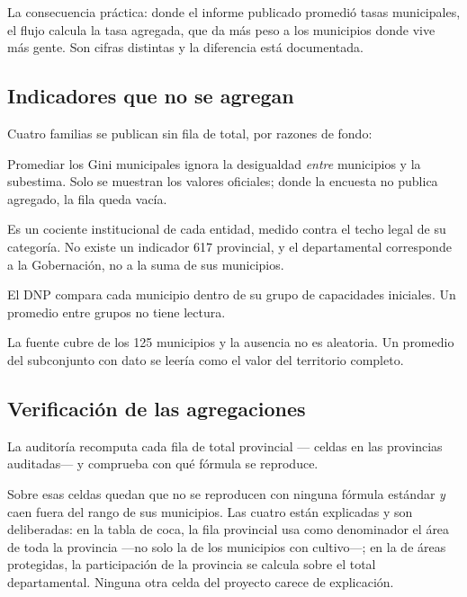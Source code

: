 \documentclass[11pt,a4paper]{article}
\begin{document}
La consecuencia práctica: donde el informe publicado promedió tasas municipales,
el flujo calcula la tasa agregada, que da más peso a los municipios donde vive
más gente. Son cifras distintas y la diferencia está documentada.

\subsection{Indicadores que no se agregan}

Cuatro familias se publican sin fila de total, por razones de fondo:

\begin{description}[leftmargin=*, style=nextline, itemsep=3pt]
  \item[Gini] Promediar los Gini municipales ignora la desigualdad
    \emph{entre} municipios y la subestima. Solo se muestran los valores
    oficiales; donde la encuesta no publica agregado, la fila queda vacía.
  \item[Ley 617] Es un cociente institucional de cada entidad, medido contra el
    techo legal de su categoría. No existe un indicador 617 provincial, y el
    departamental corresponde a la Gobernación, no a la suma de sus municipios.
  \item[MDM e IDF] El DNP compara cada municipio dentro de su grupo de
    capacidades iniciales. Un promedio entre grupos no tiene lectura.
  \item[Uso adecuado del suelo rural] La fuente cubre \cifraMunicipios{} de los
    125 municipios y la ausencia no es aleatoria. Un promedio del subconjunto
    con dato se leería como el valor del territorio completo.
\end{description}

\subsection{Verificación de las agregaciones}

La auditoría recomputa cada fila de total provincial —\cifraAgregados{} celdas
en las \cifraProvinciasCorridas{} provincias auditadas— y comprueba con qué
fórmula se reproduce.

\begin{table}[htbp]\centering
\caption{Con qué fórmula se reproduce cada valor agregado publicado}
\small

\end{table}

Sobre esas \cifraAgregados{} celdas quedan \cifraBanderasRojas{} que no se
reproducen con ninguna fórmula estándar \emph{y} caen fuera del rango de sus
municipios. Las cuatro están explicadas y son deliberadas: en la tabla de coca,
la fila provincial usa como denominador el área de toda la provincia —no solo la
de los municipios con cultivo—; en la de áreas protegidas, la participación de
la provincia se calcula sobre el total departamental. Ninguna otra celda del
proyecto carece de explicación.
\end{document}
